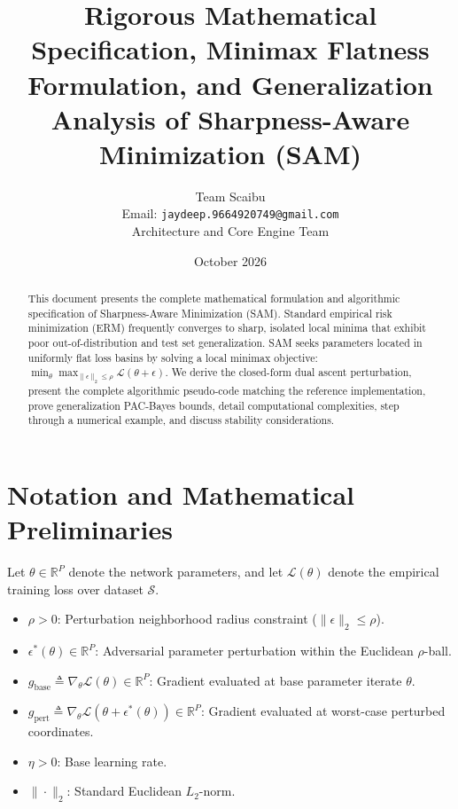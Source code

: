 \documentclass[11pt,a4paper]{article}
\title{\textbf{Rigorous Mathematical Specification, Minimax Flatness Formulation, and Generalization Analysis of Sharpness-Aware Minimization (SAM)}}
\author{Team Scaibu \\ \small Email: \texttt{jaydeep.9664920749@gmail.com} \\ \small Architecture and Core Engine Team}
\date{October 2026}
\theoremstyle{definition}
\begin{document}
\maketitle

\begin{abstract}
This document presents the complete mathematical formulation and algorithmic specification of Sharpness-Aware Minimization (SAM). Standard empirical risk minimization (ERM) frequently converges to sharp, isolated local minima that exhibit poor out-of-distribution and test set generalization. SAM seeks parameters located in uniformly flat loss basins by solving a local minimax objective: $\min_\theta \max_{\|\epsilon\|_2 \le \rho} \mathcal{L}(\theta + \epsilon)$. We derive the closed-form dual ascent perturbation, present the complete algorithmic pseudo-code matching the reference implementation, prove generalization PAC-Bayes bounds, detail computational complexities, step through a numerical example, and discuss stability considerations.
\end{abstract}

\section{Notation and Mathematical Preliminaries}

Let $\theta \in \mathbb{R}^P$ denote the network parameters, and let $\mathcal{L}(\theta)$ denote the empirical training loss over dataset $\mathcal{S}$.

\begin{itemize}
    \item $\rho > 0$: Perturbation neighborhood radius constraint ($\|\epsilon\|_2 \le \rho$).
    \item $\epsilon^*(\theta) \in \mathbb{R}^P$: Adversarial parameter perturbation within the Euclidean $\rho$-ball.
    \item $g_{\text{base}} \triangleq \nabla_\theta \mathcal{L}(\theta) \in \mathbb{R}^P$: Gradient evaluated at base parameter iterate $\theta$.
    \item $g_{\text{pert}} \triangleq \nabla_\theta \mathcal{L}(\theta + \epsilon^*(\theta)) \in \mathbb{R}^P$: Gradient evaluated at worst-case perturbed coordinates.
    \item $\eta > 0$: Base learning rate.
    \item $\|\cdot\|_2$: Standard Euclidean $L_2$-norm.
\end{itemize}
\end{document}
